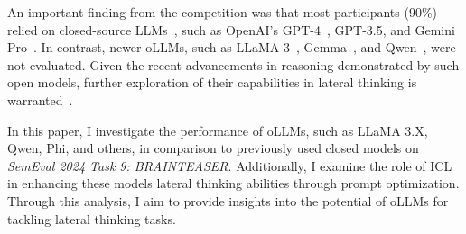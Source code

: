 An important finding from the competition was that most participants (90\%) relied on closed-source \acp{LLM}~\cite{jiangSemEval2024Task92024}, such as OpenAI's \acs{GPT}-4~\cite{openaiGPT4TechnicalReport2024}, \acs{GPT}-3.5, and Gemini Pro~\cite{teamGeminiFamilyHighly2024}. In contrast, newer \acp{oLLM}, such as \ac{LLaMA} 3~\cite{grattafioriLlama3Herd2024}, \ac{Gemma}~\cite{teamGemma2Improving2024}, and \ac{Qwen}~\cite{qwenQwen25TechnicalReport2025}, were not evaluated. Given the recent advancements in reasoning demonstrated by such open models, further exploration of their capabilities in lateral thinking is warranted~\cite{OpenLLMLeaderboard, grattafioriLlama3Herd2024, teamGemma2Improving2024, qwenQwen25TechnicalReport2025}.

In this paper, I investigate the performance of \acp{oLLM}, such as \ac{LLaMA} 3.X, \ac{Qwen}, \ac{Phi}, and others, in comparison to previously used closed models on \textit{SemEval 2024 Task 9: BRAINTEASER}. Additionally, I examine the role of \ac{ICL} in enhancing these models lateral thinking abilities through prompt optimization. Through this analysis, I aim to provide insights into the potential of \acp{oLLM} for tackling lateral thinking tasks.
